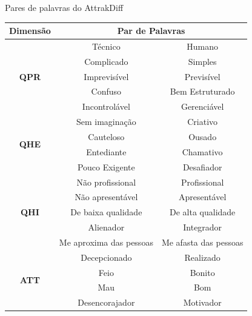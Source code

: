 \begin{quadro}
\caption{\label{qAttrakDiff}Pares de palavras do AttrakDiff}

\begin{tabular}{|c|cc|}
\hline
\textbf{Dimensão}             & \multicolumn{2}{c|}{\textbf{Par de Palavras}}                        \\ \hline
\multirow{5}{*}{\textbf{QPR}} & \multicolumn{1}{c|}{Técnico}                 & Humano                \\ \cline{2-3} 
                              & \multicolumn{1}{c|}{Complicado}              & Simples               \\ \cline{2-3} 
                              & \multicolumn{1}{c|}{Imprevisível}            & Previsível            \\ \cline{2-3} 
                              & \multicolumn{1}{c|}{Confuso}                 & Bem Estruturado       \\ \cline{2-3} 
                              & \multicolumn{1}{c|}{Incontrolável}           & Gerenciável           \\ \hline
\multirow{4}{*}{\textbf{QHE}} & \multicolumn{1}{c|}{Sem imaginação}          & Criativo              \\ \cline{2-3} 
                              & \multicolumn{1}{c|}{Cauteloso}               & Ousado                \\ \cline{2-3} 
                              & \multicolumn{1}{c|}{Entediante}              & Chamativo             \\ \cline{2-3} 
                              & \multicolumn{1}{c|}{Pouco Exigente}          & Desafiador            \\ \hline
\multirow{5}{*}{\textbf{QHI}} & \multicolumn{1}{c|}{Não profissional}        & Profissional          \\ \cline{2-3} 
                              & \multicolumn{1}{c|}{Não apresentável}        & Apresentável          \\ \cline{2-3} 
                              & \multicolumn{1}{c|}{De baixa qualidade}      & De alta qualidade     \\ \cline{2-3} 
                              & \multicolumn{1}{c|}{Alienador}               & Integrador            \\ \cline{2-3} 
                              & \multicolumn{1}{c|}{Me aproxima das pessoas} & Me afasta das pessoas \\ \hline
\multirow{4}{*}{\textbf{ATT}} & \multicolumn{1}{c|}{Decepcionado}            & Realizado             \\ \cline{2-3} 
                              & \multicolumn{1}{c|}{Feio}                    & Bonito                \\ \cline{2-3} 
                              & \multicolumn{1}{c|}{Mau}                     & Bom                   \\ \cline{2-3} 
                              & \multicolumn{1}{c|}{Desencorajador}          & Motivador             \\ \hline
\end{tabular}
\end{quadro} 

